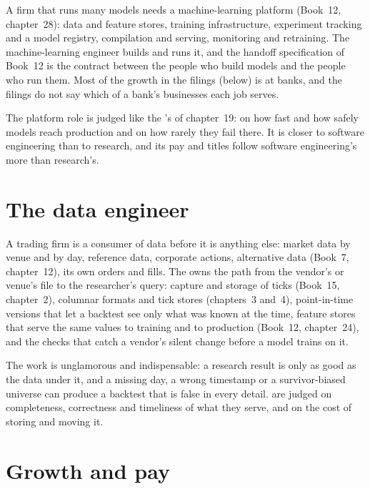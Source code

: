 A firm that runs many models needs a machine-learning platform (Book~12, chapter~28): data and feature stores, training
infrastructure, experiment tracking and a model registry, compilation and serving, monitoring and retraining. The
machine-learning engineer builds and runs it, and the handoff specification of Book~12 is the contract between the
people who build models and the people who run them. Most of the growth in the filings (below) is at banks, and the
filings do not say which of a bank's businesses each job serves.

The platform role is judged like the 's of chapter~19: on how fast and how safely models reach
production and on how rarely they fail there. It is closer to software engineering than to research, and its pay and
titles follow software engineering's more than research's.

\section{The data engineer}

A trading firm is a consumer of data before it is anything else: market data by venue and by day, reference data,
corporate actions, alternative data (Book~7, chapter~12), its own orders and fills. The  owns the path from
the vendor's or venue's file to the researcher's query: capture and storage of ticks (Book~15, chapter~2), columnar
formats and tick stores (chapters~3 and~4), point-in-time versions that let a backtest see only what was known at the
time, feature stores that serve the same values to training and to production (Book~12, chapter~24), and the checks that
catch a vendor's silent change before a model trains on it.

The work is unglamorous and indispensable: a research result is only as good as the data under it, and a missing day, a
wrong timestamp or a survivor-biased universe can produce a backtest that is false in every detail.  are
judged on completeness, correctness and timeliness of what they serve, and on the cost of storing and moving it.

\section{Growth and pay}


